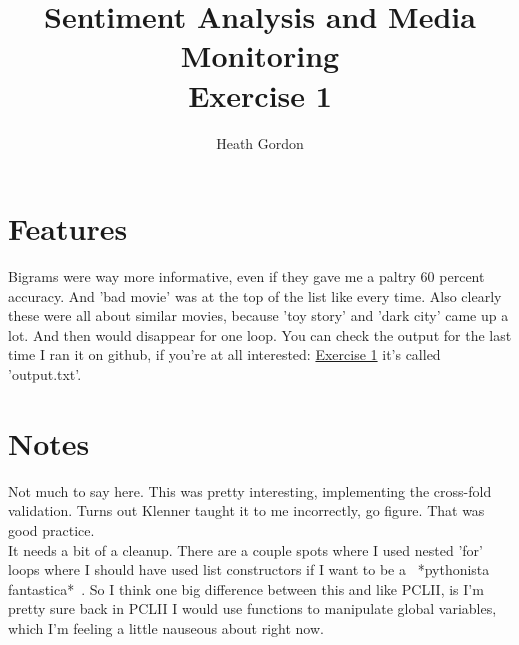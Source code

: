 \documentclass[a4paper, 10pt]{article}
\title{Sentiment Analysis and Media Monitoring\\
Exercise 1}
\author{Heath Gordon}
\begin{document}
\maketitle

\section{Features}
Bigrams were way more informative, even if they gave me a paltry 60 percent 
accuracy.
And 'bad movie' was at the top of the list like every time. 
Also clearly these were all about similar movies, because 'toy story' and 'dark city' came up a lot. And then would disappear for one loop.
You can check the output for the last time I ran it on github,
if you're at all interested: \href{https://github.com/chondromalasia/Sent_Anan_U1}{Exercise 1}  it's called 'output.txt'.

\section{Notes}
Not much to say here.
This was pretty interesting, implementing the cross-fold validation.
Turns out Klenner taught it to me incorrectly, go figure. 
That was good practice.\\
It needs a bit of a cleanup.
There are a couple spots where I used nested 'for' loops where I should have
used list constructors if I want to be a ~*pythonista fantastica*~.
So I think one big difference between this and like PCLII, is I'm pretty sure
back in PCLII I would use functions to manipulate global variables, which 
I'm feeling a little nauseous about right now.
\end{document}

